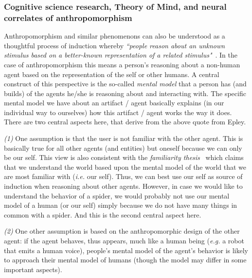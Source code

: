\documentclass{frontiersSCNS} %
\newcommand{\eg}{\textit{e.g.}\xspace}
\newcommand{\ie}{\textit{i.e.}\xspace}
\begin{document}
\subsubsection{Cognitive science research, Theory of Mind, and neural correlates
of anthropomorphism\\}

\label{sec:cognitive-expl}

Anthropomorphism and similar phenomenons can also be understood as a thoughtful
process of induction whereby \textit{``people reason about an unknown stimulus
based on a better-known representation of a related
stimulus"}~\citep{epley_when_2008}. In the case of anthropomorphism this means a
person's reasoning about a non-human agent based on the representation of the
self or other humans. A central construct of this perspective is the so-called
\textit{mental model} that a person has (and builds) of the agents he/she is
reasoning about and interacting with. The specific mental model we have about an
artifact / agent basically explains (in our individual way to ourselves) how
this artifact / agent works the way it does.  There are two central aspects
here, that derive from the above quote from Epley.

\textit{(1)} One assumption is that the user is not familiar with the other
agent. This is basically true for all other agents (and entities) but oneself
because we can only be our self. This view is also consistent with the
\emph{familiarity thesis}~\citep{hegel_understanding_2008} which claims that we
understand the world based upon the mental model of the world that we are most
familiar with (\ie our self). Thus, we can best use our self as source of induction
when reasoning about other agents. However, in case we would like to understand
the behavior of a spider, we would probably not use our mental model of a human
(or our self) simply because we do not have many things in common with a spider.
And this is the second central aspect here.

\textit{(2)} One other assumption is based on the anthropomorphic design of the
other agent: if the agent behaves, thus appears, much like a human being (\eg a
robot that emits a human voice), people's mental model of the agent's behavior
is likely to approach their mental model of humans (though the model may differ
in some important aspects).
\end{document}
